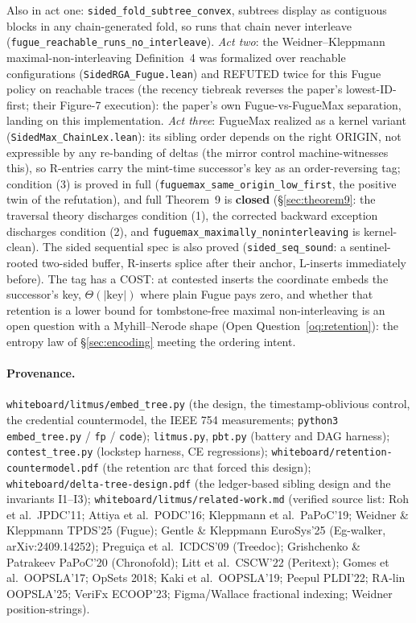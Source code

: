 \documentclass[11pt]{article}
\newcommand{\code}[1]{\texttt{#1}}
\begin{document}
\noindent Also in act one: \code{sided\_fold\_subtree\_convex},
subtrees display as contiguous blocks in any chain-generated fold,
so runs that chain never interleave
(\code{fugue\_reachable\_runs\_no\_interleave}).
\emph{Act two}: the Weidner--Kleppmann maximal-non-interleaving
Definition~4 was formalized over reachable configurations
(\code{SidedRGA\_Fugue.lean}) and REFUTED twice for this Fugue
policy on reachable traces (the recency tiebreak reverses the paper's
lowest-ID-first; their Figure-7 execution): the paper's own
Fugue-vs-FugueMax separation, landing on this implementation.
\emph{Act three}: FugueMax realized as a kernel variant
(\code{SidedMax\_ChainLex.lean}): its sibling order depends on the
right ORIGIN, not expressible by any re-banding of deltas (the mirror
control machine-witnesses this), so R-entries carry the mint-time
successor's key as an order-reversing tag; condition (3) is proved in
full (\code{fuguemax\_same\_origin\_low\_first}, the positive twin
of the refutation), and full Theorem~9 is \textbf{closed}
(\S\ref{sec:theorem9}: the traversal theory discharges condition (1),
the corrected backward exception discharges condition (2), and
\code{fuguemax\_maximally\_noninterleaving} is kernel-clean). The sided
sequential spec is also proved (\code{sided\_seq\_sound}: a
sentinel-rooted two-sided buffer, R-inserts splice after their
anchor, L-inserts immediately before). The tag has a COST: at
contested inserts the coordinate embeds the successor's key,
$\Theta(|\text{key}|)$ where plain Fugue pays zero, and whether that
retention is a lower bound for tombstone-free maximal
non-interleaving is an open question with a Myhill--Nerode shape
(Open Question~\ref{oq:retention}): the entropy law of
\S\ref{sec:encoding} meeting the ordering intent.

\paragraph{Provenance.} \code{whiteboard/litmus/embed\_tree.py} (the
design, the timestamp-oblivious control, the credential countermodel,
the IEEE 754 measurements; \code{python3 embed\_tree.py} /
\code{fp} / \code{code}); \code{litmus.py}, \code{pbt.py} (battery and
DAG harness); \code{contest\_tree.py} (lockstep harness, CE
regressions); \code{whiteboard/retention-countermodel.pdf} (the
retention arc that forced this design);
\code{whiteboard/delta-tree-design.pdf} (the ledger-based sibling
design and the invariants I1--I3);
\code{whiteboard/litmus/related-work.md} (verified source list:
Roh et al.\ JPDC'11; Attiya et al.\ PODC'16; Kleppmann et al.\
PaPoC'19; Weidner \& Kleppmann TPDS'25 (Fugue); Gentle \& Kleppmann
EuroSys'25 (Eg-walker, arXiv:2409.14252); Preguiça et al.\ ICDCS'09
(Treedoc); Grishchenko \& Patrakeev PaPoC'20 (Chronofold); Litt et
al.\ CSCW'22 (Peritext); Gomes et al.\ OOPSLA'17; OpSets 2018; Kaki et
al.\ OOPSLA'19; Peepul PLDI'22; RA-lin OOPSLA'25; VeriFx ECOOP'23;
Figma/Wallace fractional indexing; Weidner position-strings).
\end{document}
